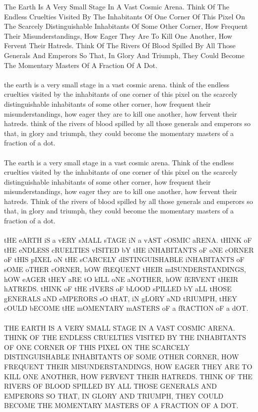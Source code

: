 \documentclass[../../Problems]{subfiles}
\begin{document}
{\begin{testcases}
{The Earth Is A Very Small Stage In A Vast Cosmic Arena. Think Of The Endless Cruelties Visited By The Inhabitants Of One Corner Of This Pixel On The Scarcely Distinguishable Inhabitants Of Some Other Corner, How Frequent Their Misunderstandings, How Eager They Are To Kill One Another, How Fervent Their Hatreds. Think Of The Rivers Of Blood Spilled By All Those Generals And Emperors So That, In Glory And Triumph, They Could Become The Momentary Masters Of A Fraction Of A Dot.\\\\
the earth is a very small stage in a vast cosmic arena. think of the endless cruelties visited by the inhabitants of one corner of this pixel on the scarcely distinguishable inhabitants of some other corner, how frequent their misunderstandings, how eager they are to kill one another, how fervent their hatreds. think of the rivers of blood spilled by all those generals and emperors so that, in glory and triumph, they could become the momentary masters of a fraction of a dot.\\\\
The earth is a very small stage in a vast cosmic arena. Think of the endless cruelties visited by the inhabitants of one corner of this pixel on the scarcely distinguishable inhabitants of some other corner, how frequent their misunderstandings, how eager they are to kill one another, how fervent their hatreds. Think of the rivers of blood spilled by all those generals and emperors so that, in glory and triumph, they could become the momentary masters of a fraction of a dot.\\\\
tHE eARTH iS a vERY sMALL sTAGE iN a vAST cOSMIC aRENA. tHINK oF tHE eNDLESS cRUELTIES vISITED bY tHE iNHABITANTS oF oNE cORNER oF tHIS pIXEL oN tHE sCARCELY dISTINGUISHABLE iNHABITANTS oF sOME oTHER cORNER, hOW fREQUENT tHEIR mISUNDERSTANDINGS, hOW eAGER tHEY aRE tO kILL oNE aNOTHER, hOW fERVENT tHEIR hATREDS. tHINK oF tHE rIVERS oF bLOOD sPILLED bY aLL tHOSE gENERALS aND eMPERORS sO tHAT, iN gLORY aND tRIUMPH, tHEY cOULD bECOME tHE mOMENTARY mASTERS oF a fRACTION oF a dOT.\\\\
THE EARTH IS A VERY SMALL STAGE IN A VAST COSMIC ARENA. THINK OF THE ENDLESS CRUELTIES VISITED BY THE INHABITANTS OF ONE CORNER OF THIS PIXEL ON THE SCARCELY DISTINGUISHABLE INHABITANTS OF SOME OTHER CORNER, HOW FREQUENT THEIR MISUNDERSTANDINGS, HOW EAGER THEY ARE TO KILL ONE ANOTHER, HOW FERVENT THEIR HATREDS. THINK OF THE RIVERS OF BLOOD SPILLED BY ALL THOSE GENERALS AND EMPERORS SO THAT, IN GLORY AND TRIUMPH, THEY COULD BECOME THE MOMENTARY MASTERS OF A FRACTION OF A DOT.}

\end{testcases}}
\end{document}

